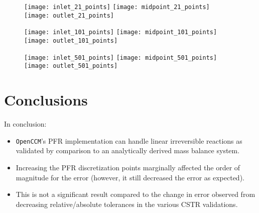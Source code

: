 \documentclass[a4paper,12pt]{article}
\begin{document}
\begin{figure}[H] %
    \texttt{[image: inlet\_21\_points]}\hfill
    \texttt{[image: midpoint\_21\_points]}\hfill
    \texttt{[image: outlet\_21\_points]}
\end{figure}
\vspace{-10pt}
\begin{figure}[H] %
    \texttt{[image: inlet\_101\_points]}\hfill
    \texttt{[image: midpoint\_101\_points]}\hfill
    \texttt{[image: outlet\_101\_points]}
\end{figure}
\vspace{-10pt}
\begin{figure}[H] %
    \texttt{[image: inlet\_501\_points]}\hfill
    \texttt{[image: midpoint\_501\_points]}\hfill
    \texttt{[image: outlet\_501\_points]}
\end{figure}

\section{Conclusions}

In conclusion:
\begin{itemize}
	\item \texttt{OpenCCM}'s PFR implementation can handle linear irreversible reactions as validated by comparison to an analytically derived mass balance system. 
	\item Increasing the PFR discretization points marginally affected the order of magnitude for the error (however, it still decreased the error as expected). 
	\item This is not a significant result compared to the change in error observed from decreasing relative/absolute tolerances in the various CSTR validations. 
\end{itemize}
\end{document}
